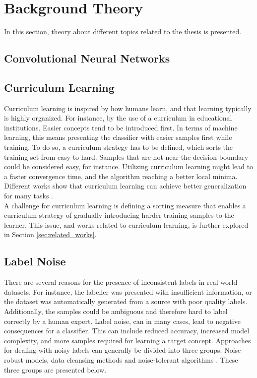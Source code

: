 \section{Background Theory}
\label{sec:background_theory}
In this section, theory about different topics related to the thesis is presented. 

\subsection{Convolutional Neural Networks}

\label{sec:convolutional_networks_background}

\subsection{Curriculum Learning}
Curriculum learning is inspired by how humans learn, and that learning typically is highly organized. For instance, by the use of a curriculum in educational institutions. Easier concepts tend to be introduced first. In terms of machine learning, this means presenting the classifier with easier samples first while training. To do so, a curriculum strategy has to be defined, which sorts the training set from easy to hard. Samples that are not near the decision boundary could be considered easy, for instance. Utilizing curriculum learning might lead to a faster convergence time, and the algorithm reaching a better local minima. Different works show that curriculum learning can achieve better generalization for many tasks \citep{Bengio_curriculumlearning} \citep{Kumar_self_paced_learning} \citep{Lu_self-paced_learning_diversity}.\\

A challenge for curriculum learning is defining a sorting measure that enables a curriculum strategy of gradually introducing harder training samples to the learner. This issue, and works related to curriculum learning, is further explored in Section \ref{sec:related_works}.\\


\subsection{Label Noise}
\label{sec:background_label_noise}
There are several reasons for the presence of inconsistent labels in real-world datasets. For instance, the labeller was presented with insufficient information, or the dataset was automatically generated from a source with poor quality labels. Additionally, the samples could be ambiguous and therefore hard to label correctly by a human expert. Label noise, can in many cases, lead to negative consequences for a classifier. This can include reduced accuracy, increased model complexity, and more samples required for learning a target concept. Approaches for dealing with noisy labels can generally be divided into three groups: Noise-robust models, data cleansing methods and noise-tolerant algorithms \citep{Frenay_label_noise_survey}. These three groups are presented below.  \\


